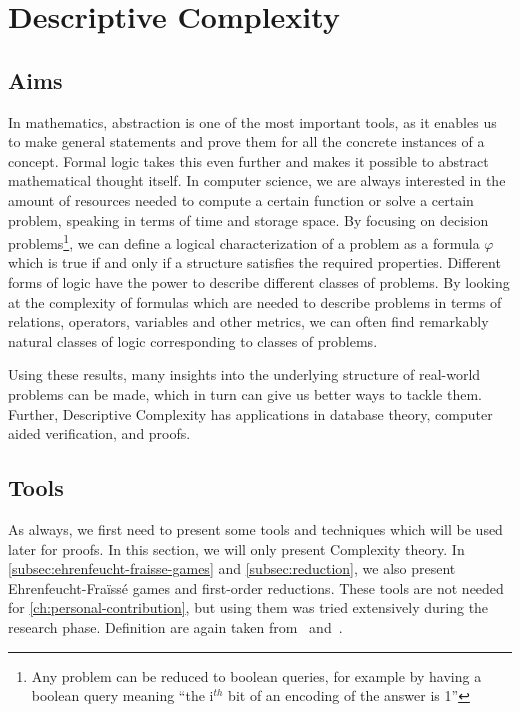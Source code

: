 

\chapter{Descriptive Complexity}\label{ch:descriptive-complexity}


\section{Aims}\label{sec:aims}

In mathematics, abstraction is one of the most important tools, as it enables us to make general statements and prove them for all the concrete instances of a concept.
Formal logic takes this even further and makes it possible to abstract mathematical thought itself.
In computer science, we are always interested in the amount of resources needed to compute a certain function or solve a certain problem, speaking in terms of time and storage space.
By focusing on decision problems\footnote{Any problem can be reduced to boolean queries, for example by having a boolean query meaning ``the i$^{th}$ bit of an encoding of the answer is 1''}, we can define a logical characterization of a problem as a formula $\varphi$ which is true if and only if a structure satisfies the required properties.
Different forms of logic have the power to describe different classes of problems.
By looking at the complexity of formulas which are needed to describe problems in terms of relations, operators, variables and other metrics, we can often find remarkably natural classes of logic corresponding to classes of problems.

Using these results, many insights into the underlying structure of real-world problems can be made, which in turn can give us better ways to tackle them.
Further, Descriptive Complexity has applications in database theory, computer aided verification, and proofs.


\section{Tools}\label{sec:tools}

As always, we first need to present some tools and techniques which will be used later for proofs.
In this section, we will only present Complexity theory.
In \cref{subsec:ehrenfeucht-fraisse-games} and \cref{subsec:reduction}, we also present Ehrenfeucht-Fraïssé games and first-order reductions.
These tools are not needed for \cref{ch:personal-contribution}, but using them was tried extensively during the research phase.
Definition are again taken from~\cite{theory-cs} and~\cite{descriptive-complexity}.

